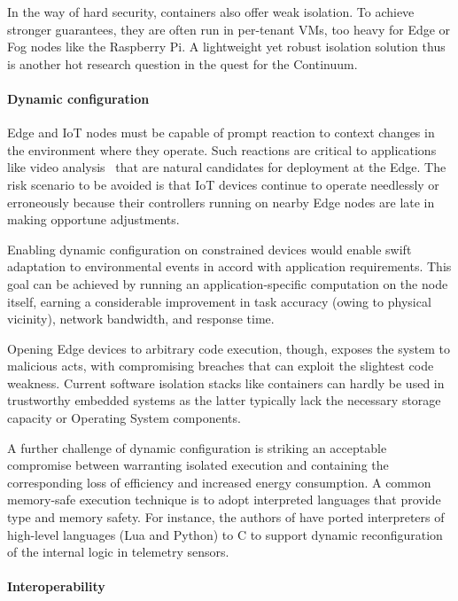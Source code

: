 In the way of hard security, containers also offer weak isolation. To achieve stronger guarantees, they are often run in per-tenant VMs, too heavy for Edge or Fog nodes like the Raspberry Pi. 
A light\-weight yet robust isolation solution thus is another hot research question in the quest for the Continuum.

\paragraph{Dynamic configuration}\label{p:dynamic-configuration}

Edge and IoT nodes must be capable of prompt reaction to context changes in the environment where they operate. 
Such reactions are critical to applications like video analysis~\cite{jang2018application} that are natural candidates for deployment at the Edge. 
The risk scenario to be avoided is that IoT devices continue to operate needlessly or erroneously because their controllers running on nearby Edge nodes are late in making opportune adjustments.

Enabling dynamic configuration on constrained devices would enable swift adaptation to environmental events in accord with application requirements. 
This goal can be achieved by running an application-specific computation on the node itself, earning a considerable improvement in task accuracy (owing to physical vicinity), network bandwidth, and response time.

Opening Edge devices to arbitrary code execution, though, exposes the system to malicious acts, with compromising breaches that can exploit the slightest code weakness.
Current software isolation stacks like containers can hardly be used in trustworthy embedded systems as the latter typically lack the necessary storage capacity or Operating System components.

A further challenge of dynamic configuration is striking an acceptable compromise between warranting isolated execution and containing the corresponding loss of efficiency and increased energy consumption. 
A common memory-safe execution technique is to adopt interpreted languages that provide type and memory safety. 
For instance, the authors of \cite{brzoza2016embedded} have ported interpreters of high-level languages (Lua and Python) to C to support dynamic reconfiguration of the internal logic in telemetry sensors.

\paragraph{Interoperability}\label{p:interoperability}


